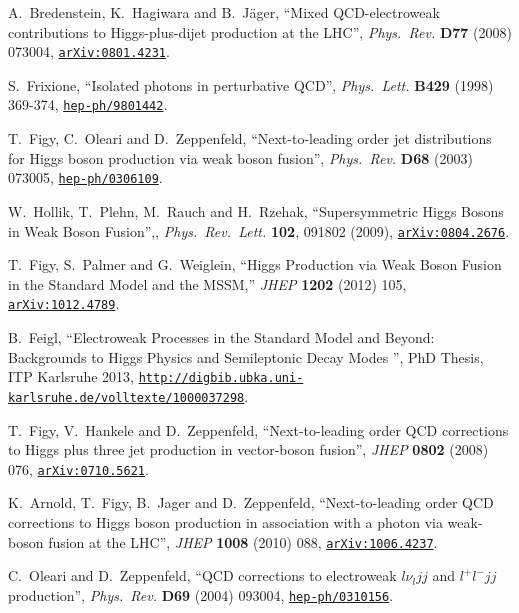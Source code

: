 \documentclass[english,12pt]{article}
\begin{document}
\begin{thebibliography}{10}
A.~Bredenstein, K.~Hagiwara and B.~J\"{a}ger, ``{Mixed QCD-electroweak
  contributions to Higgs-plus-dijet production at the LHC}'', {\em Phys.\ Rev.}
  {\bf D77} (2008) 073004,
\href{http://www.arXiv.org/abs/0801.4231}{{\tt arXiv:0801.4231}}.

S.~Frixione,
  ``Isolated photons in perturbative QCD'',
  {\em Phys.\ Lett.} {\bf B429} (1998) 369-374,
\href{http://www.arXiv.org/abs/hep-ph/9801442}{{\tt hep-ph/9801442}}.

T.~Figy, C.~Oleari and D.~Zeppenfeld, ``Next-to-leading order jet
  distributions for Higgs boson production via weak boson fusion'', {\em Phys.\
  Rev.} {\bf D68} (2003) 073005,
\href{http://www.arXiv.org/abs/hep-ph/0306109}{{\tt hep-ph/0306109}}.

  W.~Hollik, T.~Plehn, M.~Rauch and H.~Rzehak,
  ``Supersymmetric Higgs Bosons in Weak Boson Fusion'',,
  {\em Phys.\ Rev.\ Lett.} {\bf 102}, 091802 (2009),
  \href{http://www.arXiv.org/abs/0804.2676}{{\tt arXiv:0804.2676}}.

 T.~Figy, S.~Palmer and G.~Weiglein,
 ``Higgs Production via Weak Boson Fusion in the Standard Model and the MSSM,''
 {\em JHEP} {\bf 1202} (2012) 105,
 \href{http://www.arXiv.org/abs/1012.4789}{{\tt arXiv:1012.4789}}.

B.~Feigl, ``Electroweak Processes in the Standard Model and Beyond: Backgrounds to Higgs Physics and Semileptonic Decay Modes '', {PhD Thesis, ITP Karlsruhe 2013}, 
\href{http://digbib.ubka.uni-karlsruhe.de/volltexte/1000037298}{{\tt http://digbib.ubka.uni-karlsruhe.de/volltexte/1000037298}}.

T.~Figy, V.~Hankele and D.~Zeppenfeld, ``{Next-to-leading order QCD
  corrections to Higgs plus three jet production in vector-boson fusion}'',
  {\em JHEP} {\bf 0802} (2008) 076,
\href{http://www.arXiv.org/abs/0710.5621}{{\tt arXiv:0710.5621}}.

  K.~Arnold, T.~Figy, B.~Jager and D.~Zeppenfeld,
  ``Next-to-leading order QCD corrections to Higgs boson production in
  association with a photon via weak-boson fusion at the LHC'',
  {\em JHEP} {\bf 1008} (2010) 088,
\href{http://www.arXiv.org/abs/1006.4237}{{\tt arXiv:1006.4237}}.

C.~Oleari and D.~Zeppenfeld, ``QCD corrections to electroweak $l\nu_ljj$
and $l^+l^-jj$ production'', {\em Phys.\ Rev.} {\bf D69} (2004)
  093004,
\href{http://www.arXiv.org/abs/hep-ph/0310156}{{\tt hep-ph/0310156}}.


\end{thebibliography}
\end{document}
